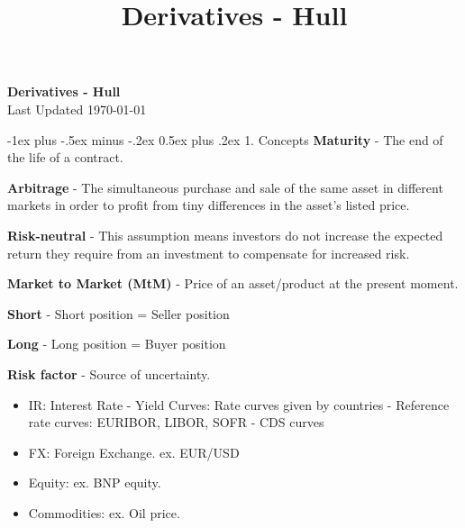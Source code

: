 \documentclass[10pt,landscape]{article}
\title{Derivatives - Hull}
\makeatletter
\renewcommand{\section}{\@startsection{section}{1}{0mm}%
                                {-1ex plus -.5ex minus -.2ex}%
                                {0.5ex plus .2ex}%
                                {\normalfont\large\bfseries}}
\makeatother
\begin{document}
\raggedright
\footnotesize

\begin{center}
    \vspace{-50mm}
    \Large{\vspace{-15mm}\textbf{Derivatives - Hull}} \\
    \footnotesize{Last Updated \today}
    \vspace{-.4mm}
\end{center}
\begin{multicols}{3}
    \setlength{\premulticols}{1pt}
    \setlength{\postmulticols}{1pt}
    \setlength{\multicolsep}{1pt}
    \setlength{\columnsep}{2pt}
    \section{1. Concepts}
    \textbf{Maturity} - The end of the life of a contract.

    \textbf{Arbitrage} - The simultaneous purchase and sale of the same asset in different markets in order to profit from tiny differences in the asset's listed price.
    
    \textbf{Risk-neutral} - This assumption means investors do not increase the expected return they require from an investment to compensate for increased risk. 

    \textbf{Market to Market (MtM)} - Price of an asset/product at the present moment.
    
    \textbf{Short} - Short position = Seller position
    
    \textbf{Long} - Long position = Buyer position
    
    \textbf{Risk factor} - Source of uncertainty.
    \begin{itemize}[label={--},leftmargin=4mm]
        \vspace{-1mm}
        \itemsep -.4mm
        \item IR: Interest Rate
            \subitem - Yield Curves: Rate curves given by countries
            \subitem - Reference rate curves: EURIBOR, LIBOR, SOFR
            \subitem - CDS curves
        \item FX: Foreign Exchange. ex. EUR/USD
        \item Equity: ex. BNP equity.
        \item Commodities: ex. Oil price.

    \end{itemize}


\end{multicols}
\end{document}
